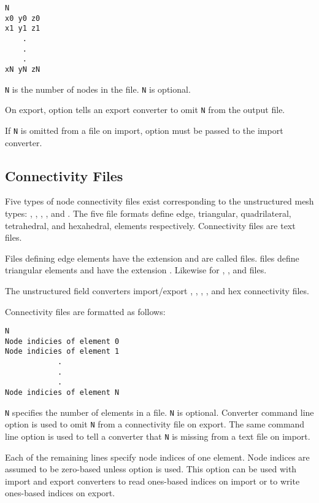 \begin{verbatim}
N
x0 y0 z0
x1 y1 z1
    .
    .
    .
xN yN zN
\end{verbatim}

\verb|N| is the number of nodes in the file.  \verb|N| is optional.

On export, option  tells an export converter to
omit \verb|N| from the output file.

If \verb|N| is omitted from a file on import, option
 must be passed to the import converter.


\subsection{Connectivity Files}
\label{sec:node_conn_fmt}

Five types of node connectivity files exist corresponding to the
unstructured mesh types: , ,
, , and
.  The five file formats define
edge, triangular, quadrilateral, tetrahedral, and hexahedral,
elements respectively.  Connectivity files are text files.

Files defining edge elements have the extension  and
are called  files.   files define triangular
elements and have the extension .  Likewise for
, , and  files.

The unstructured field converters import/export ,
, , , and hex connectivity
files.

Connectivity files are formatted as follows:

\begin{verbatim}
N
Node indicies of element 0
Node indicies of element 1
            .
            .
            .
Node indicies of element N
\end{verbatim}

\verb|N| specifies the number of elements in a file.  \verb|N| is
optional.  Converter command line option  is
used to omit \verb|N| from a connectivity file on export.  The same
command line option is used to tell a converter that \verb|N| is
missing from a text file on import.

Each of the remaining lines specify node indices of one element.
Node indices are assumed to be zero-based unless option
 is used.  This option can be used with
import and export converters to read ones-based indices on
import or to write ones-based indices on export.

